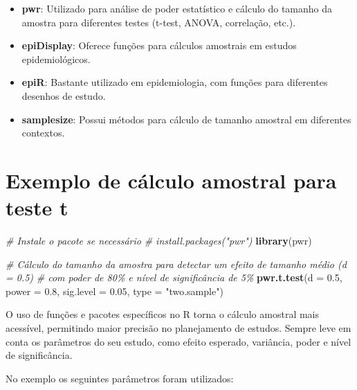 \documentclass[
]{book}
\newenvironment{Shaded}{\begin{snugshade}}{\end{snugshade}}
\newcommand{\AttributeTok}[1]{\textcolor[rgb]{0.13,0.29,0.53}{#1}}
\newcommand{\CommentTok}[1]{\textcolor[rgb]{0.56,0.35,0.01}{\textit{#1}}}
\newcommand{\FloatTok}[1]{\textcolor[rgb]{0.00,0.00,0.81}{#1}}
\newcommand{\FunctionTok}[1]{\textcolor[rgb]{0.13,0.29,0.53}{\textbf{#1}}}
\newcommand{\NormalTok}[1]{#1}
\newcommand{\StringTok}[1]{\textcolor[rgb]{0.31,0.60,0.02}{#1}}
\providecommand{\tightlist}{%
  \setlength{\itemsep}{0pt}\setlength{\parskip}{0pt}}
\begin{document}
\begin{itemize}
\tightlist
\item
  \textbf{pwr}: Utilizado para análise de poder estatístico e cálculo do tamanho da amostra para diferentes testes (t-test, ANOVA, correlação, etc.).
\item
  \textbf{epiDisplay}: Oferece funções para cálculos amostrais em estudos epidemiológicos.
\item
  \textbf{epiR}: Bastante utilizado em epidemiologia, com funções para diferentes desenhos de estudo.
\item
  \textbf{samplesize}: Possui métodos para cálculo de tamanho amostral em diferentes contextos.
\end{itemize}

\section{Exemplo de cálculo amostral para teste t}\label{exemplo-de-cuxe1lculo-amostral-para-teste-t}

\begin{Shaded}
\begin{Highlighting}[]
\CommentTok{\# Instale o pacote se necessário}
\CommentTok{\# install.packages("pwr")}
\FunctionTok{library}\NormalTok{(pwr)}

\CommentTok{\# Cálculo do tamanho da amostra para detectar um efeito de tamanho médio (d = 0.5)}
\CommentTok{\# com poder de 80\% e nível de significância de 5\%}
\FunctionTok{pwr.t.test}\NormalTok{(}\AttributeTok{d =} \FloatTok{0.5}\NormalTok{, }\AttributeTok{power =} \FloatTok{0.8}\NormalTok{, }\AttributeTok{sig.level =} \FloatTok{0.05}\NormalTok{, }\AttributeTok{type =} \StringTok{"two.sample"}\NormalTok{)}
\end{Highlighting}
\end{Shaded}

O uso de funções e pacotes específicos no R torna o cálculo amostral mais acessível, permitindo maior precisão no planejamento de estudos. Sempre leve em conta os parâmetros do seu estudo, como efeito esperado, variância, poder e nível de significância.

No exemplo os seguintes parâmetros foram utilizados:
\end{document}
